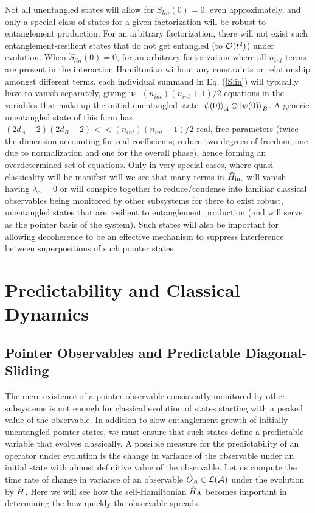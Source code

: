 \documentclass[aps,pra,onecolumn,nofootinbib,notitlepage,11pt,tightenlines]{revtex4-1}
\begin{document}
 Not all unentangled states will allow for $\ddot{S}_{lin}(0) = 0$, even approximately, and only a special class of states for a given factorization will be robust to entanglement production. For an arbitrary factorization, there will not exist such entanglement-resilient states that do not get entangled (to $\mathcal{O}(t^2)$) under evolution. When $\ddot{S}_{lin}(0) = 0$, for an arbitrary factorization where all $n_{int}$ terms are present in the interaction Hamiltonian without any constraints or relationship amongst different terms, each individual summand in Eq. (\ref{Slin}) will typically have to vanish separately, giving us $~ (n_{int})(n_{int} + 1)/2$ equations in the variables that make up the initial unentangled state $\ket{\psi(0)}_{A} \otimes \ket{\psi(0)}_{B}$. A generic unentangled state of this form has $(2d_{A} - 2)(2d_{B} -2) << (n_{int})(n_{int} + 1)/2$ real, free parameters (twice the dimension accounting for real coefficients; reduce two degrees of freedom, one due to normalization and one for the overall phase), hence forming an overdetermined set of equations. Only in very special cases, where quasi-classicality will be manifest will we see that many terms in $\hat{H}_{\rm{int}}$ will vanish having $\lambda_{\alpha} = 0$ or will conspire together to reduce/condense into familiar classical observables being monitored by other subsystems for there to exist robust, unentangled states that are resilient to entanglement production (and will serve as the pointer basis of the system). Such states will also be important for allowing decoherence to be an effective mechanism to suppress interference between superpositions of such pointer states. 


\section{Predictability and Classical Dynamics}
\label{sec:predictability}

\subsection{Pointer Observables and Predictable Diagonal-Sliding}
\label{sec:pointer}

The mere existence of a pointer observable consistently monitored by other subsystems is not enough for classical evolution of states starting with a peaked value of the observable. In addition to slow entanglement growth of initially unentangled pointer states, we must ensure that such states define a predictable variable that evolves classically. A possible measure for the predictability of an operator under evolution is the change in variance of the observable under an initial state with almost definitive value of the observable. Let us compute the time rate of change in variance of an observable $\hat{O}_{A} \in \mathcal{L}(\mathcal{A})$ under the evolution by $\hat{H}$. Here we will see how the self-Hamiltonian $\hat{H}_{A}$ becomes important in determining the how quickly the observable spreads. 
\end{document}
